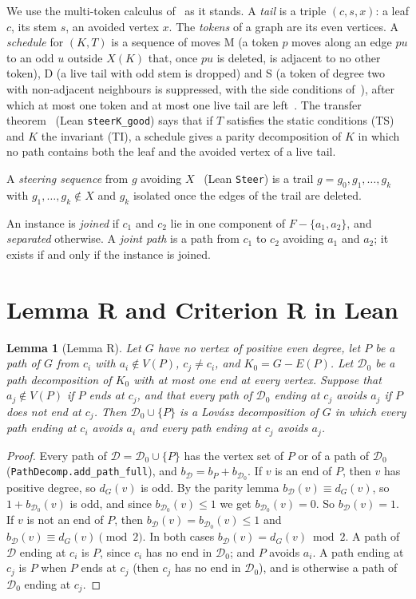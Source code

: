 \documentclass[11pt]{amsart}
\newtheorem{lemma}[theorem]{Lemma}
\theoremstyle{definition}
\newcommand{\cD}{\mathcal D}
\newcommand{\lean}[1]{\quad{\footnotesize[Lean: \texttt{#1}]}}
\begin{document}
We use the multi-token calculus of~\cite{MT} as it stands. A \emph{tail} is a triple $(c,s,x)$:
a leaf $c$, its stem $s$, an avoided vertex $x$. The \emph{tokens} of a graph are its even vertices.
A \emph{schedule} for $(K,T)$ is a sequence of moves M (a token $p$ moves along an edge $pu$ to an odd
$u$ outside $X(K)$ that, once $pu$ is deleted, is adjacent to no other token), D (a live tail
with odd stem is dropped) and S (a token of degree two with non-adjacent neighbours is suppressed,
with the side conditions of~\cite[Def.~2.2]{MT}), after which at most one token and at most one live tail are left~\cite[Def.~2.2]{MT}. The transfer
theorem~\cite[Thm.~2.7]{MT} (Lean \texttt{steerK\_good}) says that if $T$ satisfies the static
conditions (TS) and $K$ the invariant (TI), a schedule gives a parity decomposition of $K$ in which no
path contains both the leaf and the avoided vertex of a live tail.

A \emph{steering sequence} from $g$ avoiding $X$~\cite[Def.~3.1]{NA} (Lean \texttt{Steer}) is a
trail $g=g_0,g_1,\dots,g_k$ with $g_1,\dots,g_k\notin X$ and $g_k$ isolated once the edges of the
trail are deleted.

An instance is \emph{joined} if $c_1$ and $c_2$ lie in one component of $F-\{a_1,a_2\}$, and
\emph{separated} otherwise. A \emph{joint path} is a path from $c_1$ to $c_2$ avoiding $a_1$ and
$a_2$; it exists if and only if the instance is joined.

\section{Lemma R and Criterion R in Lean}\label{sec:R}

\begin{lemma}[Lemma R]\label{lem:R}
Let $G$ have no vertex of positive even degree, let $P$ be a path of $G$ from $c_i$ with $a_i\notin
V(P)$, $c_j\ne c_i$, and $K_0=G-E(P)$. Let $\cD_0$ be a path decomposition of $K_0$ with at most one end
at every vertex. Suppose that $a_j\notin V(P)$ if $P$ ends at $c_j$, and that every path of $\cD_0$
ending at $c_j$ avoids $a_j$ if $P$ does not end at $c_j$. Then $\cD_0\cup\{P\}$ is a Lov\'asz
decomposition of $G$ in which every path ending at $c_i$ avoids $a_i$ and every path ending at $c_j$
avoids $a_j$.\lean{lemmaR}
\end{lemma}

\begin{proof}
Every path of $\cD=\cD_0\cup\{P\}$ has the vertex set of $P$ or of a path of $\cD_0$
(\texttt{PathDecomp.add\_path\_full}), and $b_\cD=b_P+b_{\cD_0}$. If $v$ is an end of $P$, then $v$
has positive degree, so $d_G(v)$ is odd. By the parity lemma $b_\cD(v)\equiv d_G(v)$, so
$1+b_{\cD_0}(v)$ is odd, and since $b_{\cD_0}(v)\le1$ we get $b_{\cD_0}(v)=0$. So $b_\cD(v)=1$. If $v$ is not
an end of $P$, then $b_\cD(v)=b_{\cD_0}(v)\le1$ and $b_\cD(v)\equiv d_G(v)\pmod 2$. In both cases
$b_\cD(v)=d_G(v)\bmod2$. A path of $\cD$ ending at $c_i$ is $P$, since $c_i$ has no end in $\cD_0$;
and $P$ avoids $a_i$. A path ending at $c_j$ is $P$ when $P$ ends at $c_j$ (then $c_j$ has no end
in $\cD_0$), and is otherwise a path of $\cD_0$ ending at $c_j$.
\end{proof}
\end{document}
